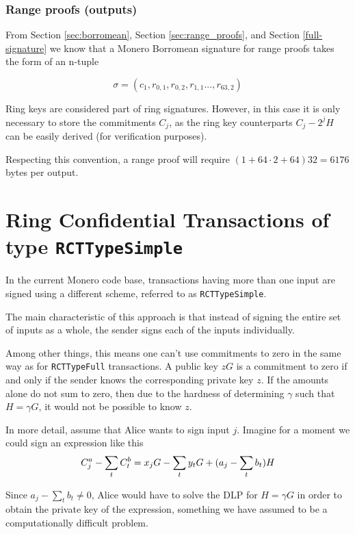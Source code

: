\subsubsection*{Range proofs (outputs)}
\label{range-proofs-space}

From Section \ref{sec:borromean}, Section \ref{sec:range_proofs}, and Section \ref{full-signature} we know that a Monero Borromean signature for range proofs takes the form of an n-tuple

\[\sigma = (c_1, r_{0, 1}, r_{0, 2}, r_{1, 1}..., r_{63, 2} )  \]

Ring keys are considered part of ring signatures. However, in this case it is only necessary to store the commitments $C_j$, as the ring key counterparts $C_j - 2^j H$ can be easily derived (for verification purposes).

Respecting this convention, a range proof will require \( ( 1 + 64 \cdot 2 + 64  ) 32 = 6176\) bytes per output.
\\


\section{ Ring Confidential Transactions of type {\tt RCTTypeSimple}}
\label{sec:RCTTypeSimple}

In the current Monero code base, transactions having more than one input are signed using a different scheme, referred to as {\tt RCTTypeSimple}.

The main characteristic of this approach is that instead of signing the entire set of inputs as a whole, the sender signs each of the inputs individually.

Among other things, this means one can’t use commitments to zero in the same way as for {\tt RCTTypeFull} transactions. A public key $z G$ is a commitment to zero if and only if the sender knows the corresponding private key $z$. If the amounts alone do not sum to zero, then due to the hardness of determining $\gamma$ such that $H = \gamma G$, it would not be possible to know $z$.

In more detail, assume that Alice wants to sign input $j$. Imagine for a moment we could sign an expression like this\\
\[  C^a_{j} - \sum\limits_t C^b_{t} \\
= x_j G -  \sum_t y_t G + (a_j - \sum\limits_t  b_t) H \]

Since \(a_j - \sum\limits_t  b_t \ne 0\), Alice would have to solve the DLP for \(H = \gamma G\) in order to obtain the private key of the expression, something we have assumed to be a computationally difficult problem.


